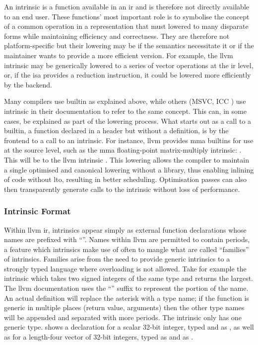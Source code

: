 \documentclass[\main/thesis.tex]{subfiles}
\begin{document}
An \gls{intrinsic} is a function available in an \gls{ir} and is therefore not directly available to an end user.
These functions' most important role is to symbolise the concept of a common operation in a representation that must lowered to many disparate forms while maintaining efficiency and correctness.
They are therefore not platform-specific but their lowering may be if the semantics necessitate it or if the maintainer wants to provide a more efficient version.
For example, the \gls{llvm} \gls{intrinsic}  may be generically lowered to a series of vector operations at the \gls{ir} level, or, if the \gls{isa} provides a reduction instruction, it could be lowered more efficiently by the backend.

Many compilers use \gls{builtin} as explained above, while others (\eg MSVC, ICC ) use \gls{intrinsic} in their documentation to refer to the same concept.
This can, in some cases, be explained as part of the lowering process.
What starts out as a call to a \gls{builtin}, a function declared in a header but without a definition, is  by the frontend to a call to an intrinsic.
For instance, \gls{llvm} provides \gls{mma} \glspl{builtin} for use at the source level, such as the \gls{mma} floating-point matrix-multiply intrinsic: .
This will be  to the \gls{llvm} \gls{intrinsic} .
This \gls{lowering} allows the compiler to maintain a single optimised and canonical lowering without a library, thus enabling inlining of code without \gls{lto}, resulting in better scheduling.
Optimisation passes can also then transparently generate calls to the intrinsic without loss of performance.

\subsubsection{Intrinsic Format}
Within \gls{llvm} \gls{ir}, \glspl{intrinsic} appear simply as external function declarations whose names are prefixed with ``''.
Names within \gls{llvm} are permitted to contain periods, a feature which \glspl{intrinsic} make use of often to \gls{mangle} what are called ``families'' of \glspl{intrinsic}.
Families arise from the need to provide generic \glspl{intrinsic} to a strongly typed language where overloading is not allowed.
Take for example the  \gls{intrinsic} which takes two signed integers of the same type and returns the largest.
The \gls{llvm} documentation uses the ``'' suffix to represent the  portion of the name.
An actual definition will replace the asterisk with a type name; if the function is generic in multiple places (return value, arguments) then the other type names will be appended and separated with more periods.
The  \gls{intrinsic} only has one generic type.
 shows a declaration for a scalar 32-bit integer, typed and  as , as well as for a length-four vector of 32-bit integers, typed as  and  as .
\end{document}
